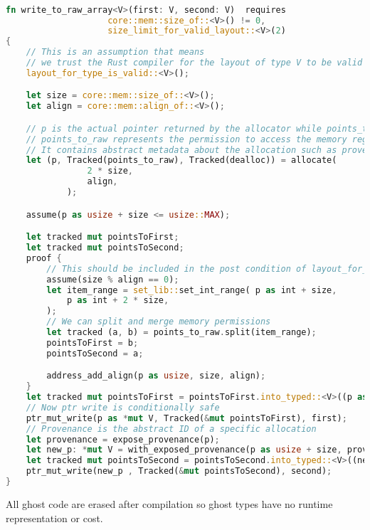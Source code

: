 \documentclass[conference]{IEEEtran}
\begin{document}
\begin{lstlisting}[language=Rust,style=colouredRust, caption={a pedagogical example showcasing how ghost memory permission converts unsafe raw pointer operation to safe code}, label = {9}]

fn write_to_raw_array<V>(first: V, second: V)  requires 
                    core::mem::size_of::<V>() != 0, 
                    size_limit_for_valid_layout::<V>(2)
{
    // This is an assumption that means 
    // we trust the Rust compiler for the layout of type V to be valid
    layout_for_type_is_valid::<V>();

    let size = core::mem::size_of::<V>();
    let align = core::mem::align_of::<V>();

    // p is the actual pointer returned by the allocator while points_to_raw and dealloc are ghost.
    // points_to_raw represents the permission to access the memory region pointed to by p 
    // It contains abstract metadata about the allocation such as provenance, size, alignment and memory value
    let (p, Tracked(points_to_raw), Tracked(dealloc)) = allocate(
                2 * size,
                align,
            );

    assume(p as usize + size <= usize::MAX);

    let tracked mut pointsToFirst;
    let tracked mut pointsToSecond;
    proof {
        // This should be included in the post condition of layout_for_type_is_valid
        assume(size % align == 0);
        let item_range = set_lib::set_int_range( p as int + size,
            p as int + 2 * size,
        );
        // We can split and merge memory permissions 
        let tracked (a, b) = points_to_raw.split(item_range);
        pointsToFirst = b;
        pointsToSecond = a;

        address_add_align(p as usize, size, align);
    }
    let tracked mut pointsToFirst = pointsToFirst.into_typed::<V>((p as usize) as usize);
    // Now ptr write is conditionally safe
    ptr_mut_write(p as *mut V, Tracked(&mut pointsToFirst), first);
    // Provenance is the abstract ID of a specific allocation
    let provenance = expose_provenance(p);
    let new_p: *mut V = with_exposed_provenance(p as usize + size, provenance);
    let tracked mut pointsToSecond = pointsToSecond.into_typed::<V>((new_p as usize) as usize);
    ptr_mut_write(new_p , Tracked(&mut pointsToSecond), second);
}
\end{lstlisting}
All ghost code are erased after compilation so ghost types have no runtime representation or cost.
\end{document}
